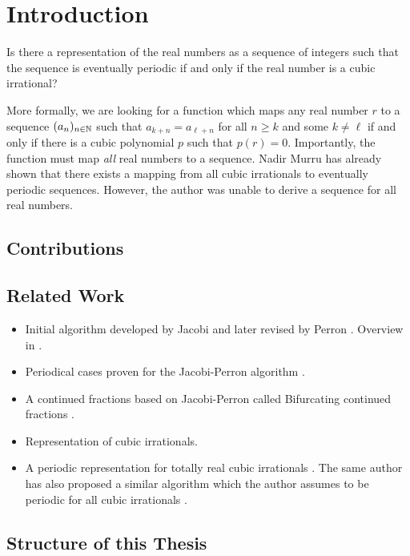 \chapter{Introduction}

\begin{problem}
  Is there a representation of the real numbers as a sequence of integers such
  that the sequence is eventually periodic if and only if the real number is a
  cubic irrational?
\end{problem}

More formally, we are looking for a function which maps any real number $r$ to
a sequence $(a_n)_{n \in {\mathbb N}}$ such that $a_{k+n} = a_{\ell+n}$ for all $n \ge k$ and
some $k \ne \ell$ if and only if there is a cubic polynomial $p$ such that $p(r) = 0$.
Importantly, the function must map \emph{all} real numbers to a sequence.
Nadir Murru \cite{Murru15} has already shown that there exists a mapping from all
cubic irrationals to eventually periodic sequences.
However, the author was unable to derive a sequence for all real numbers.

\section{Contributions}

\section{Related Work}

\begin{itemize}
  \item Initial algorithm developed by Jacobi \cite{Jacobi68} and later revised
    by Perron \cite{07}. Overview in \cite{Bernstein71}.
  \item
    Periodical cases proven for the Jacobi-Perron algorithm \cite{Bernstein64}.
  \item
    A continued fractions based on Jacobi-Perron called Bifurcating continued
    fractions \cite{Bifurcating Continued Fractions}.
  \item
    Representation of cubic irrationals. \cite{Murru15}
  \item
    A periodic representation for totally real cubic irrationals \cite{Karpenkov24}.
    The same author has also proposed a similar algorithm which the author
    assumes to be periodic for all cubic irrationals \cite{Karpenkov21}.
\end{itemize}

\section{Structure of this Thesis}
